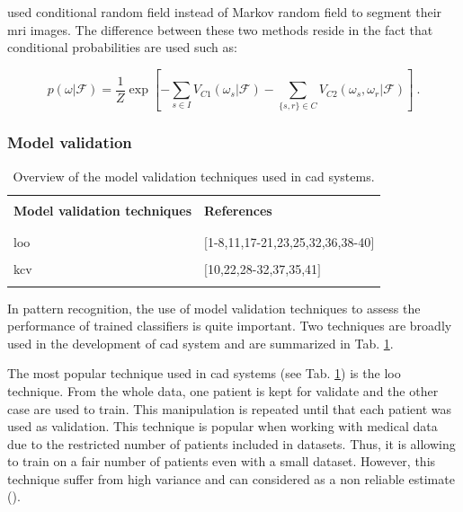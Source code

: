 \begin{enumerate}[leftmargin=*]
\cite{Artan2009,Artan2010} used conditional random field instead of Markov random field to segment their \ac{mri} images. The difference between these two methods reside in the fact that conditional probabilities are used such as:

\begin{equation}
	p(\omega|\mathcal{F}) =  \frac{1}{Z} \exp \left[ - \sum_{s \in I} V_{C1}(\omega_s|\mathcal{F}) - \sum_{\{s,r\} \in C } V_{C2} (\omega_s,\omega_r|\mathcal{F})  \right] \ .
\label{eq:crf}
\end{equation}

\end{enumerate}

\subsubsection{Model validation}

\begin{table}
	\caption{Overview of the model validation techniques used in \ac{cad} systems.}
	\small
	\begin{tabular}{p{.55\linewidth} p{.35\linewidth}}
		\hline \\ [-1.5ex]
		\textbf{Model validation techniques} & \textbf{References} \\ \\ [-1.5ex]
		\hline \\ [-1.5ex]
		\quad \acs{loo} & $[$1-8,11,17-21,23,25,32,36,38-40$]$ \\ \\ [-1.5ex]
		\quad \acs{kcv} & $[$10,22,28-32,37,35,41$]$ \\ \\ [-1.5ex]
		\hline
	\end{tabular}
	\label{tab:valmod}
\end{table}

In pattern recognition, the use of model validation techniques to assess the performance of trained classifiers is quite important. Two techniques are broadly used in the development of \ac{cad} system and are summarized in Tab. \ref{tab:valmod}.

The most popular technique used in \ac{cad} systems (see Tab. \ref{tab:valmod}) is the \acf{loo} technique. From the whole data, one patient is kept for validate and the other case are used to train. This manipulation is repeated until that each patient was used as validation. This technique is popular when working with medical data due to the restricted number of patients included in datasets. Thus, it is allowing to train on a fair number of patients even with a small dataset. However, this technique suffer from high variance and can considered as a non reliable estimate (\cite{Efron1983}).

